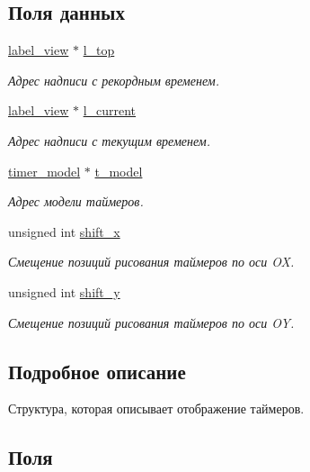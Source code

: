 \subsection*{Поля данных}
\begin{DoxyCompactItemize}
\item 
\hyperlink{structlabel__view}{label\+\_\+view} $\ast$ \hyperlink{structtimer__view_af1e48631c4b2eab39e49ac0ad7390b70}{l\+\_\+top}
\begin{DoxyCompactList}\small\item\em Адрес надписи с рекордным временем. \end{DoxyCompactList}\item 
\hyperlink{structlabel__view}{label\+\_\+view} $\ast$ \hyperlink{structtimer__view_a033b8a6e58675feb9c2c4b66fb56be9b}{l\+\_\+current}
\begin{DoxyCompactList}\small\item\em Адрес надписи с текущим временем. \end{DoxyCompactList}\item 
\hyperlink{structtimer__model}{timer\+\_\+model} $\ast$ \hyperlink{structtimer__view_a016f2b9a9c2d969b5a92f7d1a893bd3d}{t\+\_\+model}
\begin{DoxyCompactList}\small\item\em Адрес модели таймеров. \end{DoxyCompactList}\item 
unsigned int \hyperlink{structtimer__view_aae1b218e8d1526bd4abe54898de94a04}{shift\+\_\+x}
\begin{DoxyCompactList}\small\item\em Смещение позиций рисования таймеров по оси OX. \end{DoxyCompactList}\item 
unsigned int \hyperlink{structtimer__view_a52be0cc476c2242a46407d3d729ecbe4}{shift\+\_\+y}
\begin{DoxyCompactList}\small\item\em Смещение позиций рисования таймеров по оси OY. \end{DoxyCompactList}\end{DoxyCompactItemize}


\subsection{Подробное описание}
Структура, которая описывает отображение таймеров. 

\subsection{Поля}
\mbox{\label{structtimer__view_a033b8a6e58675feb9c2c4b66fb56be9b}} 
